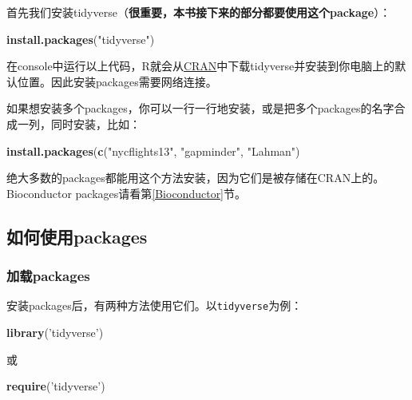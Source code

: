 \documentclass[]{book}
\newenvironment{Shaded}{\begin{snugshade}}{\end{snugshade}}
\newcommand{\KeywordTok}[1]{\textcolor[rgb]{0.13,0.29,0.53}{\textbf{#1}}}
\newcommand{\NormalTok}[1]{#1}
\newcommand{\StringTok}[1]{\textcolor[rgb]{0.31,0.60,0.02}{#1}}
\begin{document}
首先我们安装tidyverse（\textbf{很重要，本书接下来的部分都要使用这个package}）：

\begin{Shaded}
\begin{Highlighting}[]
\KeywordTok{install.packages}\NormalTok{(}\StringTok{"tidyverse"}\NormalTok{)}
\end{Highlighting}
\end{Shaded}

在console中运行以上代码，R就会从\href{https://cran.r-project.org}{CRAN}中下载tidyverse并安装到你电脑上的默认位置。因此安装packages需要网络连接。

如果想安装多个packages，你可以一行一行地安装，或是把多个packages的名字合成一列，同时安装，比如：

\begin{Shaded}
\begin{Highlighting}[]
\KeywordTok{install.packages}\NormalTok{(}\KeywordTok{c}\NormalTok{(}\StringTok{"nycflights13"}\NormalTok{, }\StringTok{"gapminder"}\NormalTok{, }\StringTok{"Lahman"}\NormalTok{)}
\end{Highlighting}
\end{Shaded}

绝大多数的packages都能用这个方法安装，因为它们是被存储在CRAN上的。Bioconductor packages请看第\ref{Bioconductor}节。

\hypertarget{package-use}{%
\subsection{如何使用packages}\label{package-use}}

\hypertarget{pkg-load}{%
\subsubsection{加载packages}\label{pkg-load}}

安装packages后，有两种方法使用它们。以\texttt{tidyverse}为例：

\begin{Shaded}
\begin{Highlighting}[]
\KeywordTok{library}\NormalTok{(}\StringTok{'tidyverse'}\NormalTok{)}
\end{Highlighting}
\end{Shaded}

或

\begin{Shaded}
\begin{Highlighting}[]
\KeywordTok{require}\NormalTok{(}\StringTok{'tidyverse'}\NormalTok{)}
\end{Highlighting}
\end{Shaded}
\end{document}
